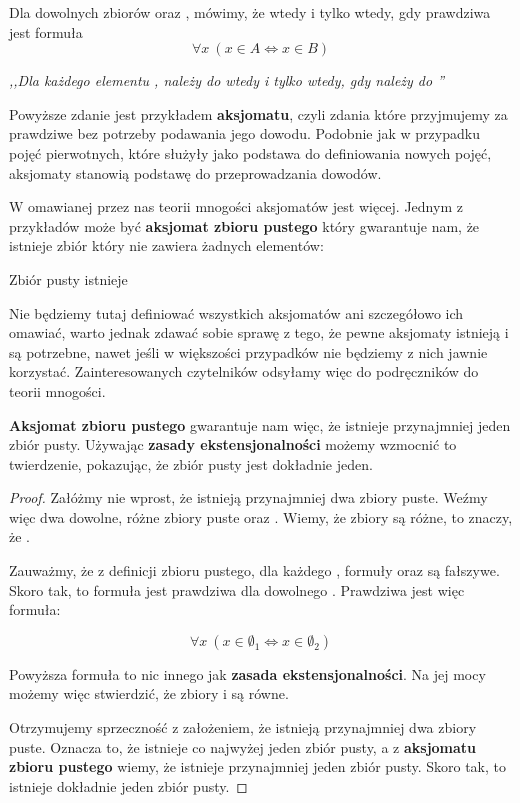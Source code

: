 \begin{axiom}
Dla dowolnych zbiorów  oraz , mówimy, że  wtedy i tylko wtedy, gdy prawdziwa jest formuła
\[ 
\forall{x}\ (x \in A \Leftrightarrow x \in B)
\]
\begin{center}
    \textit{,,Dla każdego elementu ,  należy do  wtedy i tylko wtedy, gdy  należy do ''}
\end{center}
\end{axiom}

Powyższe zdanie jest przykładem \textbf{aksjomatu}, czyli zdania które przyjmujemy za prawdziwe bez potrzeby podawania jego dowodu. Podobnie jak w przypadku pojęć pierwotnych, które służyły jako podstawa do definiowania nowych pojęć, aksjomaty stanowią podstawę do przeprowadzania dowodów.

W omawianej przez nas teorii mnogości aksjomatów jest więcej. Jednym z przykładów może być \textbf{aksjomat zbioru pustego} który gwarantuje nam, że istnieje zbiór który nie zawiera żadnych elementów:

\begin{axiom}
Zbiór pusty istnieje
\end{axiom}

Nie będziemy tutaj definiować wszystkich aksjomatów ani szczegółowo ich omawiać, warto jednak zdawać sobie sprawę z tego, że pewne aksjomaty istnieją i są potrzebne, nawet jeśli w większości przypadków nie będziemy z nich jawnie korzystać. Zainteresowanych czytelników odsyłamy więc do podręczników do teorii mnogości.

\textbf{Aksjomat zbioru pustego} gwarantuje nam więc, że istnieje przynajmniej jeden zbiór pusty. Używając \textbf{zasady ekstensjonalności} możemy wzmocnić to twierdzenie, pokazując, że zbiór pusty jest dokładnie jeden.

\begin{proof}
Załóżmy nie wprost, że istnieją przynajmniej dwa zbiory puste. Weźmy więc dwa dowolne, różne zbiory puste  oraz . Wiemy, że zbiory są różne, to znaczy, że .

Zauważmy, że z definicji zbioru pustego, dla każdego , formuły  oraz   są fałszywe. Skoro tak, to formuła  jest prawdziwa dla dowolnego . Prawdziwa jest więc formuła:

\[
\forall{x}\ (x \in \emptyset_1 \Leftrightarrow x \in \emptyset_2)
\]

Powyższa formuła to nic innego jak \textbf{zasada ekstensjonalności}. Na jej mocy możemy więc stwierdzić, że zbiory  i  są równe.

Otrzymujemy sprzeczność z założeniem, że istnieją przynajmniej dwa zbiory puste. Oznacza to, że istnieje co najwyżej jeden zbiór pusty, a z \textbf{aksjomatu zbioru pustego} wiemy, że istnieje przynajmniej jeden zbiór pusty. Skoro tak, to istnieje dokładnie jeden zbiór pusty.

\end{proof}

